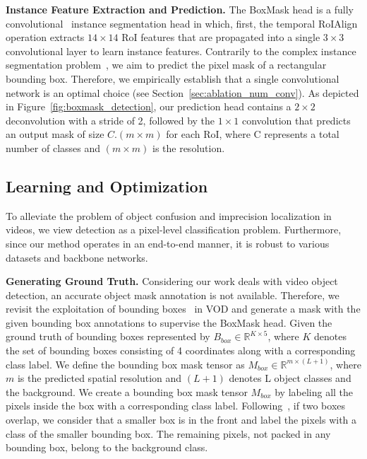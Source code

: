 \documentclass[10pt,twocolumn,letterpaper]{article}
\begin{document}
\noindent \textbf{Instance Feature Extraction and Prediction.}
The BoxMask head is a fully convolutional~\cite{long2015fully} instance segmentation head in which, first, the temporal RoIAlign operation extracts $14 \times 14$ RoI features that are propagated into a single $3 \times 3$ convolutional layer to learn instance features. Contrarily to the complex instance segmentation problem~\cite{he2017mask, chen2019hybrid}, we aim to predict the pixel mask of a rectangular bounding box. Therefore, we empirically establish that a single convolutional network is an optimal choice (see Section~\ref{sec:ablation_num_conv}). As depicted in Figure~\ref{fig:boxmask_detection}, our prediction head contains a $2 \times 2$ deconvolution with a stride of 2, followed by the $1 \times 1$ convolution that predicts an output mask of size $C.(m \times m)$ for each RoI, where C represents a total number of classes and $(m \times m)$ is the resolution.


\subsection{Learning and Optimization}
\label{sec:boxMask_learning}
To alleviate the problem of object confusion and imprecision localization in videos, we view detection as a pixel-level classification problem. Furthermore, since our method operates in an end-to-end manner, it is robust to various datasets and backbone networks.

\vspace{3pt}
\noindent \textbf{Generating Ground Truth. }
Considering our work deals with video object detection, an accurate object mask annotation is not available. Therefore, we revisit the exploitation of bounding boxes~\cite{dai2015boxsup, bounding_box, bbox_2seg} in VOD and generate a mask with the given bounding box annotations to supervise the BoxMask head. Given the ground truth of bounding boxes represented by $B_{box} \in \mathbb{R}^{K \times 5}$, where $K$ denotes the set of bounding boxes consisting of 4 coordinates along with a corresponding class label. We define the bounding box mask tensor as $M_{box} \in \mathbb{R}^{m \times (L+1)}$, where $m$ is the predicted spatial resolution and $(L+1)$ denotes L object classes and the background. We create a bounding box mask tensor $M_{box}$ by labeling all the pixels inside the box with a corresponding class label. Following~\cite{bbox_SDI, bbox_2seg}, if two boxes overlap, we consider that a smaller box is in the front and label the pixels with a class of the smaller bounding box. The remaining pixels, not packed in any bounding box, belong to the background class.
\end{document}
